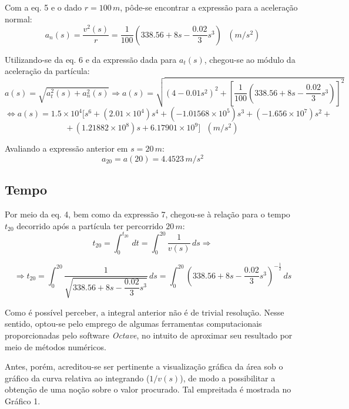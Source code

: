 \documentclass[a4paper, 12pt]{article}
\begin{document}
	Com a eq. 5 e o dado $r=100\,m$, pôde-se encontrar a expressão para a aceleração normal:
	\begin{equation}
		a_n(s)=\frac{v^2(s)}{r}=\frac{1}{100}\left(338.56+8s-\frac{0.02}{3}s^3\right)\,\,\,\,(m/s^2)
	\end{equation}
	
	Utilizando-se da eq. 6 e da expressão dada para $a_t(s)$, chegou-se ao módulo da aceleração da partícula:
	$$a(s)=\sqrt{a_t^2(s)+a_n^2(s)}\Longrightarrow a(s)= \sqrt{(4-0.01s^2)^2+
	\left[\frac{1}{100}\left(338.56+8s-\frac{0.02}{3}s^3\right)\right]^2}$$
	$$\Longleftrightarrow a(s)=1.5\times 10^4[s^6+(2.01\times 10^4)s^4+(-1.01568\times 10^5)s^3+(-1.656\times 10^7)s^2+$$
	$$+\,(1.21882\times 10^8)s+6.17901\times 10^9]\,\,\,\,(m/s^2)$$
	
	Avaliando a expressão anterior em $s=20\,m$: $$a_{20}=a(20)=4.4523\,m/s^2$$
	
	\subsection{Tempo}
	
	Por meio da eq. 4, bem como da expressão 7, chegou-se à relação para o tempo $t_{20}$ decorrido após a partícula ter
	percorrido $20\,m$: $$t_{20}=\int_{0}^{t_{20}}\,dt=\int_{0}^{20}\frac{1}{v(s)}\,ds\Longrightarrow$$
	
	\newpage
	
	$$\Longrightarrow t_{20}=\int_{0}^{20}\frac{1}{\sqrt{338.56+8s-\dfrac{0.02}{3}s^3}}\,ds=
	\int_{0}^{20}\left(338.56+8s-\frac{0.02}{3}s^3\right)^{-\frac{1}{2}}\,ds$$
	
	Como é possível perceber, a integral anterior não é de trivial resolução. Nesse sentido, optou-se pelo emprego de algumas
	ferramentas computacionais proporcionadas pelo software \textit{Octave}, no intuito de aproximar seu resultado por meio
	de métodos numéricos.
	
	Antes, porém, acreditou-se ser pertinente a visualização gráfica da área sob o gráfico da curva relativa ao integrando 
	($1/v(s)$), de modo a possibilitar a obtenção de uma noção sobre o valor procurado. Tal empreitada é mostrada no Gráfico 1.	
	
\end{document}
